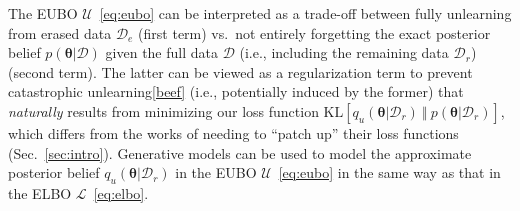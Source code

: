 \documentclass{article}
\theoremstyle{definition}
\newtheorem{remark}{Remark}
\newcommand{\todo}[1]{}
\newcommand{\mcl}[1]{\mathcal{#1}}
\newcommand{\da}{\mcl{D}}
\newcommand{\dc}{\mcl{D}_r}
\newcommand{\dr}{\mcl{D}_e}
\begin{document}
\todo{mention another form of evidence upper bound but only useful if exact posterior can be computed}
%
\todo{talk about stochastic optimization version of EUBO}
%
The EUBO $\mcl{U}$~\eqref{eq:eubo} can be interpreted as a trade-off between fully unlearning from erased data $\dr$ (first term) vs.~not entirely forgetting the exact posterior belief $p(\bm{\theta}|\da)$ given the full data $\da$ (i.e., including the remaining data $\dc$) (second term). The latter can be viewed as a regularization term to prevent catastrophic unlearning\cref{beef} (i.e., potentially induced by the former) 
that \emph{naturally} results from minimizing our loss function $\text{KL}[q_u(\bm{\theta}|\dc)\ \Vert\ p(\bm{\theta}|\dc)]$, which 
differs from the works of \cite{du2019lifelong,golatkar2019eternal} needing to ``patch up'' their loss functions (Sec.~\ref{sec:intro}).
Generative models can be used to model the approximate posterior belief $q_u(\bm{\theta}|\dc)$ in the EUBO $\mcl{U}$~\eqref{eq:eubo} in the same way as that in the ELBO $\mcl{L}$~\eqref{eq:elbo}.%
%
%
\end{document}
